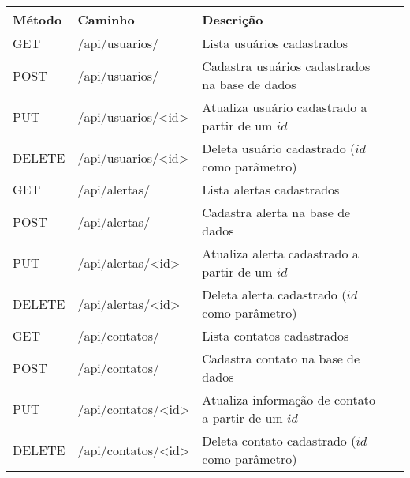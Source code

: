 \begin{tabular}{llll}
\toprule
Método & Caminho       & Descrição  \\
\midrule
GET    & /api/usuarios/ & Lista usuários cadastrados \\
\midrule
POST   & /api/usuarios/ & Cadastra usuários cadastrados na base de dados \\
\midrule
PUT    & /api/usuarios/<id> & Atualiza usuário cadastrado a partir de um $id$ \\
\midrule
DELETE & /api/usuarios/<id> & Deleta usuário cadastrado ($id$ como parâmetro) \\
\midrule
GET    & /api/alertas/ & Lista alertas cadastrados \\
\midrule
POST   & /api/alertas/ & Cadastra alerta na base de dados \\
\midrule
PUT    & /api/alertas/<id> & Atualiza alerta cadastrado a partir de um $id$ \\
\midrule
DELETE & /api/alertas/<id> & Deleta alerta cadastrado ($id$ como parâmetro) \\
\midrule
GET    & /api/contatos/ & Lista contatos cadastrados \\
\midrule
POST   & /api/contatos/ & Cadastra contato na base de dados \\
\midrule
PUT    & /api/contatos/<id> & Atualiza informação de contato a partir de um $id$ \\
\midrule
DELETE & /api/contatos/<id> & Deleta contato cadastrado ($id$ como parâmetro) \\
\bottomrule
\end{tabular}
